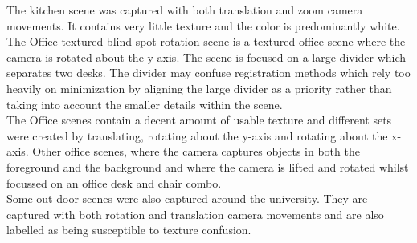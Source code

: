 The kitchen scene was captured with both translation and zoom camera movements. It contains very little texture and the color is predominantly white. The Office textured blind-spot rotation scene is a textured office scene where the camera is rotated about the y-axis. The scene is focused on a large divider which separates two desks. The divider may confuse registration methods which rely too heavily on minimization by aligning the large divider as a priority rather than taking into account the smaller details within the scene. \\

The Office scenes contain a decent amount of usable texture and different sets were created by translating, rotating about the y-axis and rotating about the x-axis. Other office scenes, where the camera captures objects in both the foreground and the background and where the camera is lifted and rotated whilst focussed on an office desk and chair combo. \\

Some out-door scenes were also captured around the university. They are captured with both rotation and translation camera movements and are also labelled as being susceptible to texture confusion.
